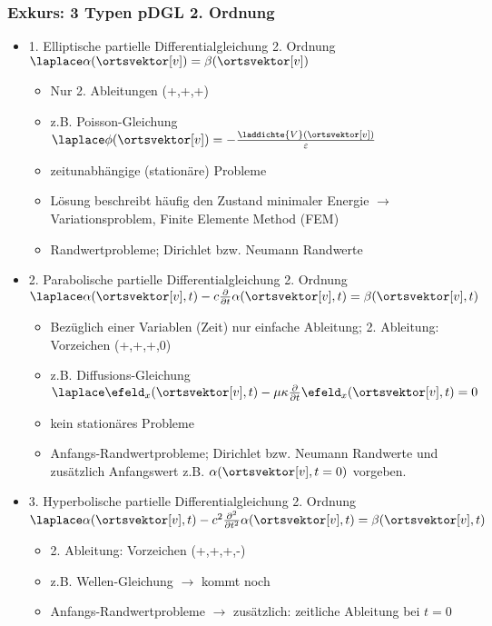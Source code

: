 \begin{frame}
  \frametitle{Exkurs: 3 Typen pDGL 2. Ordnung}
  \begin{itemize}[<+->]
  \item \alert{1. Elliptische partielle Differentialgleichung 2. Ordnung} $\laplace \alpha(\ortsvektor[v]) = \beta(\ortsvektor[v])$
    \begin{itemize}[<+->]
      \item Nur 2. Ableitungen (+,+,+)
    \item z.B. Poisson-Gleichung $\laplace\phi(\ortsvektor[v])=-\frac{\laddichte{V}(\ortsvektor[v])}{\varepsilon}$
  \item zeitunabhängige (stationäre) Probleme
  \item Lösung beschreibt häufig den Zustand \alert{minimaler Energie} $\to$ Variationsproblem, Finite Elemente Method (FEM) 
    \item \alert{Randwert}probleme; Dirichlet bzw. Neumann Randwerte
  \end{itemize}

\item \alert{2. Parabolische partielle Differentialgleichung 2. Ordnung} $\laplace \alpha(\ortsvektor[v], t) - c\frac{\partial}{\partial t}\alpha(\ortsvektor[v], t) = \beta(\ortsvektor[v], t)$
  \begin{itemize}[<+->]
    \item Bezüglich einer Variablen (Zeit) nur einfache Ableitung; 2. Ableitung: Vorzeichen (+,+,+,0)
    \item z.B. Diffusions-Gleichung $\laplace \efeld_x(\ortsvektor[v], t) -\mu\kappa \frac{\partial}{\partial t} \efeld_x(\ortsvektor[v], t) = 0$
  \item kein stationäres Probleme
    \item \alert{Anfangs-Randwert}probleme; Dirichlet bzw. Neumann Randwerte und zusätzlich Anfangswert z.B. $\alpha(\ortsvektor[v], t=0)$ vorgeben.
  \end{itemize}

\item \alert{3. Hyperbolische partielle Differentialgleichung 2. Ordnung} $\laplace \alpha(\ortsvektor[v], t) - c^2\frac{\partial^2}{\partial t^2}\alpha(\ortsvektor[v], t) = \beta(\ortsvektor[v], t)$
  \begin{itemize}[<+->]
    \item 2. Ableitung: Vorzeichen (+,+,+,-)
    \item z.B. Wellen-Gleichung $\to$ \alert{kommt noch}
    \item \alert{Anfangs-Randwert}probleme $\to$ \alert{zusätzlich:} zeitliche Ableitung bei $t=0$
  \end{itemize}
  
\end{itemize}
\end{frame}


   
